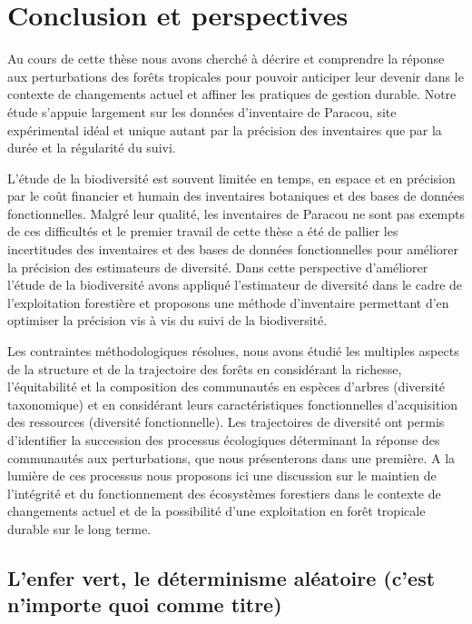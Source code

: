 \documentclass[
  11pt,
  french,
  A4paper,
  extrafontsizes,onecolumn,openright
  ]{memoir}
\begin{document}
\chapter{Conclusion et perspectives}\label{conclusion-et-perspectives}

Au cours de cette thèse nous avons cherché à décrire et comprendre la
réponse aux perturbations des forêts tropicales pour pouvoir anticiper
leur devenir dans le contexte de changements actuel et affiner les
pratiques de gestion durable. Notre étude s'appuie largement sur les
données d'inventaire de Paracou, site expérimental idéal et unique
autant par la précision des inventaires que par la durée et la
régularité du suivi.

L'étude de la biodiversité est souvent limitée en temps, en espace et en
précision par le coût financier et humain des inventaires botaniques et
des bases de données fonctionnelles. Malgré leur qualité, les
inventaires de Paracou ne sont pas exempts de ces difficultés et le
premier travail de cette thèse a été de pallier les incertitudes des
inventaires et des bases de données fonctionnelles pour améliorer la
précision des estimateurs de diversité. Dans cette perspective
d'améliorer l'étude de la biodiversité avons appliqué l'estimateur de
diversité dans le cadre de l'exploitation forestière et proposons une
méthode d'inventaire permettant d'en optimiser la précision vis à vis du
suivi de la biodiversité.

Les contraintes méthodologiques résolues, nous avons étudié les
multiples aspects de la structure et de la trajectoire des forêts en
considérant la richesse, l'équitabilité et la composition des
communautés en espèces d'arbres (diversité taxonomique) et en
considérant leurs caractéristiques fonctionnelles d'acquisition des
ressources (diversité fonctionnelle). Les trajectoires de diversité ont
permis d'identifier la succession des processus écologiques déterminant
la réponse des communautés aux perturbations, que nous présenterons dans
une première. A la lumière de ces processus nous proposons ici une
discussion sur le maintien de l'intégrité et du fonctionnement des
écosystèmes forestiers dans le contexte de changements actuel et de la
possibilité d'une exploitation en forêt tropicale durable sur le long
terme.

\section{L'enfer vert, le déterminisme aléatoire (c'est n'importe quoi
comme
titre)}\label{lenfer-vert-le-determinisme-aleatoire-cest-nimporte-quoi-comme-titre}
\end{document}

